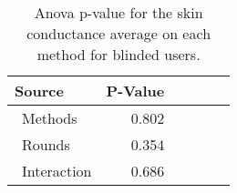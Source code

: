 
\begin{table}[!htb]
\centering
\caption{Anova p-value for the skin conductance average on each method for blinded users.}
\label{tab:blocanova_gsr_two_way_sight}
\begin{tabular}{lrrrrl}
\toprule
          Source & P-Value \\
\midrule
    \    Methods &   0.802 \\
     \    Rounds &   0.354 \\
\    Interaction &   0.686 \\
\bottomrule
\end{tabular}
\end{table}

